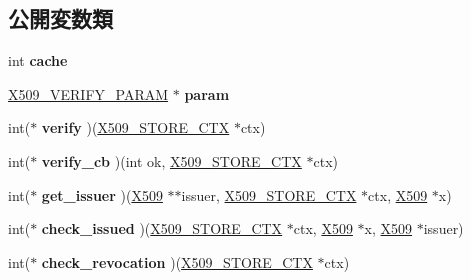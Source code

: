 \subsection*{公開変数類}
\begin{DoxyCompactItemize}
\item 
\hypertarget{structx509__store__st_a39100a4cc433d10485ffe0c30c5b88f8}{}int {\bfseries cache}\label{structx509__store__st_a39100a4cc433d10485ffe0c30c5b88f8}

\item 
\hypertarget{structx509__store__st_a988c764019923790356d956bc071c50b}{}\hyperlink{struct_x509___v_e_r_i_f_y___p_a_r_a_m__st}{X509\+\_\+\+V\+E\+R\+I\+F\+Y\+\_\+\+P\+A\+R\+A\+M} $\ast$ {\bfseries param}\label{structx509__store__st_a988c764019923790356d956bc071c50b}

\item 
\hypertarget{structx509__store__st_a942efe26133aadd04d45f30a824644a7}{}int($\ast$ {\bfseries verify} )(\hyperlink{structx509__store__ctx__st}{X509\+\_\+\+S\+T\+O\+R\+E\+\_\+\+C\+T\+X} $\ast$ctx)\label{structx509__store__st_a942efe26133aadd04d45f30a824644a7}

\item 
\hypertarget{structx509__store__st_a2babc2b1c606dc4a45bee39bcb2dddad}{}int($\ast$ {\bfseries verify\+\_\+cb} )(int ok, \hyperlink{structx509__store__ctx__st}{X509\+\_\+\+S\+T\+O\+R\+E\+\_\+\+C\+T\+X} $\ast$ctx)\label{structx509__store__st_a2babc2b1c606dc4a45bee39bcb2dddad}

\item 
\hypertarget{structx509__store__st_a1201b752d9780b08579097b6f53f05b6}{}int($\ast$ {\bfseries get\+\_\+issuer} )(\hyperlink{structx509__st}{X509} $\ast$$\ast$issuer, \hyperlink{structx509__store__ctx__st}{X509\+\_\+\+S\+T\+O\+R\+E\+\_\+\+C\+T\+X} $\ast$ctx, \hyperlink{structx509__st}{X509} $\ast$x)\label{structx509__store__st_a1201b752d9780b08579097b6f53f05b6}

\item 
\hypertarget{structx509__store__st_a28e3031f30d155bfcee3077781875dd5}{}int($\ast$ {\bfseries check\+\_\+issued} )(\hyperlink{structx509__store__ctx__st}{X509\+\_\+\+S\+T\+O\+R\+E\+\_\+\+C\+T\+X} $\ast$ctx, \hyperlink{structx509__st}{X509} $\ast$x, \hyperlink{structx509__st}{X509} $\ast$issuer)\label{structx509__store__st_a28e3031f30d155bfcee3077781875dd5}

\item 
\hypertarget{structx509__store__st_af48617053d5abd22e6f0bb877a3801d9}{}int($\ast$ {\bfseries check\+\_\+revocation} )(\hyperlink{structx509__store__ctx__st}{X509\+\_\+\+S\+T\+O\+R\+E\+\_\+\+C\+T\+X} $\ast$ctx)\label{structx509__store__st_af48617053d5abd22e6f0bb877a3801d9}


\end{DoxyCompactItemize}
